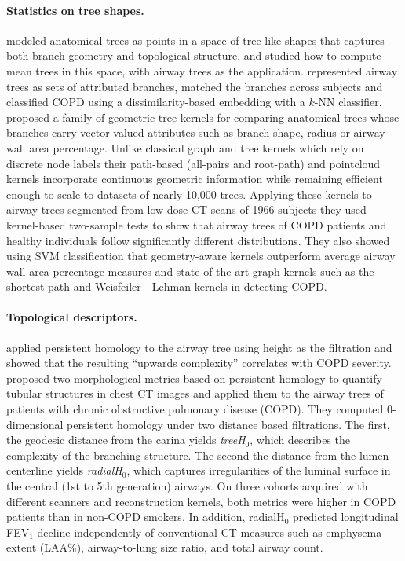 \paragraph{Statistics on tree shapes.}   %
\citet{feragen2011means} modeled anatomical trees as points in a space of tree-like shapes
that captures both branch geometry and topological structure, and studied how to compute mean
trees in this space, with airway trees as the application. \citet{sorensen2011dissimilarity}
represented airway trees as sets of attributed branches, matched the branches across
subjects and classified COPD using a dissimilarity-based embedding with a $k$-NN classifier.
\citet{feragen2013geometric} proposed a family of geometric tree kernels for comparing
anatomical trees whose branches carry vector-valued attributes such as branch shape, radius
or airway wall area percentage. Unlike classical graph and tree kernels which rely on
discrete node labels their path-based (all-pairs and root-path) and pointcloud kernels
incorporate continuous geometric information while remaining efficient enough to scale to
datasets of nearly 10{,}000 trees. Applying these kernels to airway trees segmented from
low-dose CT scans of 1966 subjects they used kernel-based two-sample tests to show that
airway trees of COPD patients and healthy individuals follow significantly different
distributions. They also showed using SVM classification that geometry-aware kernels
outperform average airway wall area percentage measures and state of the art graph kernels
such as the shortest path and Weisfeiler - Lehman kernels in detecting COPD.

\paragraph{Topological descriptors.}     %
\citet{belchi2018topology} applied persistent homology to the airway tree using height as the
filtration and showed that the resulting ``upwards complexity'' correlates with COPD
severity. \citet{kaji2024airway} proposed two morphological metrics based on persistent homology to
quantify tubular structures in chest CT images and applied them to the airway trees of
patients with chronic obstructive pulmonary disease (COPD). They computed 0-dimensional
persistent homology under two distance based filtrations. The first, the geodesic distance
from the carina yields \emph{treeH$_0$}, which describes the complexity of the branching
structure. The second the distance from the lumen centerline yields \emph{radialH$_0$},
which captures irregularities of the luminal surface in the central (1st to 5th generation)
airways. On three cohorts acquired with different scanners and reconstruction kernels, both
metrics were higher in COPD patients than in non-COPD smokers. In addition, radialH$_0$
predicted longitudinal FEV$_1$ decline independently of conventional CT measures such as
emphysema extent (LAA\%), airway-to-lung size ratio, and total airway count.
